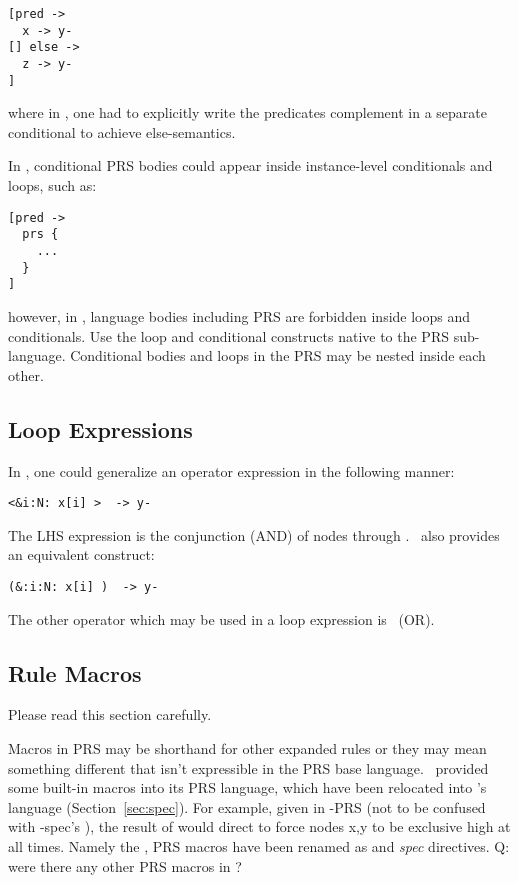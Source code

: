 \begin{verbatim}
[pred ->
  x -> y-
[] else ->
  z -> y-
]
\end{verbatim}

\noindent
where in \CAST, one had to explicitly write the predicates complement
in a separate conditional to achieve else-semantics.  

In \CAST, conditional PRS bodies could appear inside instance-level 
conditionals and loops, such as:

\begin{verbatim}
[pred ->
  prs {
    ...
  }
]
\end{verbatim}

\noindent
however, in \hac, language bodies including PRS are forbidden
inside loops and conditionals.  
Use the loop and conditional constructs native to the PRS sub-language.  
Conditional bodies and loops in the PRS may be nested inside each other.  

\subsection{Loop Expressions}
\label{sec:prs:loopexpr}

In \CAST, one could generalize an operator expression 
in the following manner:

\begin{verbatim}
<&i:N: x[i] >  -> y-
\end{verbatim}

The LHS expression is the conjunction (AND) of nodes 
 through .  
\hac\ also provides an equivalent construct:

\begin{verbatim}
(&:i:N: x[i] )  -> y-
\end{verbatim}

The other operator which may be used in a loop expression is \prsor\ (OR).

\subsection{Rule Macros}
\label{sec:prs:macros}

Please read this section carefully.  

Macros in PRS may be shorthand for other expanded rules or 
they may mean something different that isn't expressible in
the PRS base language.  
\CAST\ provided some built-in macros into its PRS language, 
which have been relocated into \hac's
 language (Section~\ref{sec:spec}).  
For example, given  in \CAST-PRS 
(not to be confused with \CAST-spec's ), 
the result of  would direct  to 
force nodes {x,y} to be exclusive high at all times.  
Namely the ,  PRS macros have been
renamed as  and  \emph{spec} directives.  
Q: were there any other PRS macros in \CAST?

